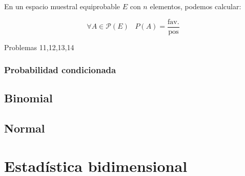 \begin{prop}
En un espacio muestral equiprobable $E$ con $n$ elementos, podemos calcular:

\[\forall A\in \mathcal{P}(E)\;\;\; P(A) = \frac{\text{fav.}}{\text{pos}}\]
\end{prop}

Problemas 11,12,13,14

\subsubsection{Probabilidad condicionada}

\subsection{Binomial}

\subsection{Normal}


\section{Estadística bidimensional}

